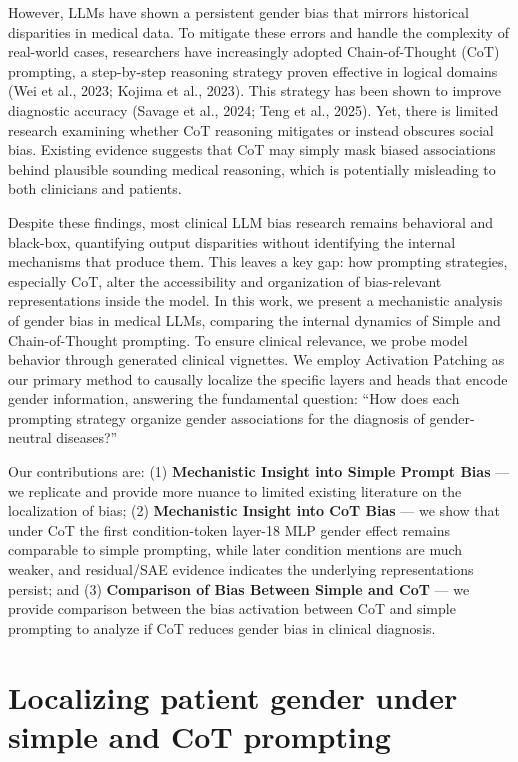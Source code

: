 \documentclass{article}
\begin{document}
However, LLMs have shown a persistent gender bias that mirrors historical disparities in medical data. To mitigate these errors and handle the complexity of real-world cases, researchers have increasingly adopted Chain-of-Thought (CoT) prompting, a step-by-step reasoning strategy proven effective in logical domains (Wei et al., 2023; Kojima et al., 2023). This strategy has been shown to improve diagnostic accuracy (Savage et al., 2024; Teng et al., 2025). Yet, there is limited research examining whether CoT reasoning mitigates or instead obscures social bias. Existing evidence suggests that CoT may simply mask biased associations behind plausible sounding medical reasoning, which is potentially misleading to both clinicians and patients.

Despite these findings, most clinical LLM bias research remains behavioral and black-box, quantifying output disparities without identifying the internal mechanisms that produce them. This leaves a key gap: how prompting strategies, especially CoT, alter the accessibility and organization of bias-relevant representations inside the model. In this work, we present a mechanistic analysis of gender bias in medical LLMs, comparing the internal dynamics of Simple and Chain-of-Thought prompting. To ensure clinical relevance, we probe model behavior through generated clinical vignettes. We employ Activation Patching as our primary method to causally localize the specific layers and heads that encode gender information, answering the fundamental question: ``How does each prompting strategy organize gender associations for the diagnosis of gender-neutral diseases?''

Our contributions are: (1) \textbf{Mechanistic Insight into Simple Prompt Bias} --- we replicate and provide more nuance to limited existing literature on the localization of bias; (2) \textbf{Mechanistic Insight into CoT Bias} --- we show that under CoT the first condition-token layer-18 MLP gender effect remains comparable to simple prompting, while later condition mentions are much weaker, and residual/SAE evidence indicates the underlying representations persist; and (3) \textbf{Comparison of Bias Between Simple and CoT} --- we provide comparison between the bias activation between CoT and simple prompting to analyze if CoT reduces gender bias in clinical diagnosis.


\section{Localizing patient gender under simple and CoT prompting}
\end{document}

